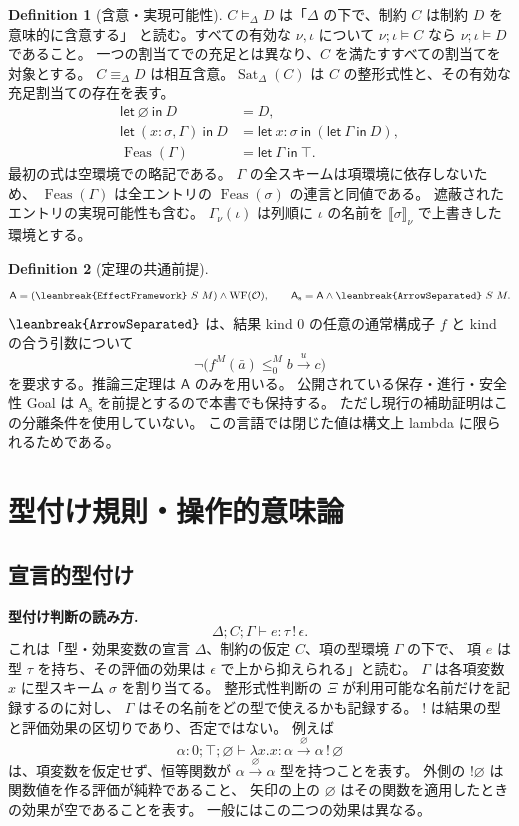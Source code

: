 \documentclass[a4paper,11pt]{article}
\theoremstyle{definition}
\newtheorem{definition}{Definition}[section]
\newcommand{\ops}{\mathcal O}
\newcommand{\emp}{\varnothing}
\newcommand{\arr}[3]{#1\xrightarrow{#2}#3}
\newcommand{\jj}[6]{#1;#2;#3\vdash #4:#5\,!\,#6}
\newcommand{\ent}[2]{#1\models_{\Delta}#2}
\newcommand{\den}[1]{\llbracket #1\rrbracket}
\newcommand{\Let}[3]{\mathsf{let}\ #1:#2\ \mathsf{in}\ #3}
\newcommand{\Feas}{\operatorname{Feas}}
\newcommand{\WF}{\operatorname{WF}}
\newcommand{\lean}[1]{\ifmmode\text{\texttt{\leanbreak{#1}}}\else\texttt{\leanbreak{#1}}\fi}
\newcommand{\A}{\mathsf A}
\newcommand{\AS}{\mathsf A_{\mathrm s}}
\begin{document}
\begin{definition}[含意・実現可能性]
$\ent C D$ は「$\Delta$ の下で、制約 $C$ は制約 $D$ を意味的に含意する」
と読む。すべての有効な $\nu,\iota$ について
$\nu;\iota\models C$ なら $\nu;\iota\models D$ であること。
一つの割当てでの充足とは異なり、$C$ を満たすすべての割当てを対象とする。
$C\equiv_\Delta D$ は相互含意。$\operatorname{Sat}_\Delta(C)$ は
$C$ の整形式性と、その有効な充足割当ての存在を表す。
\begin{align*}
 \mathsf{let}\ \emp\ \mathsf{in}\ D&=D,\\
 \mathsf{let}\ (x:\sigma,\Gamma)\ \mathsf{in}\ D
   &=\Let{x}{\sigma}{(\mathsf{let}\ \Gamma\ \mathsf{in}\ D)},\\
 \Feas(\Gamma)&=\mathsf{let}\ \Gamma\ \mathsf{in}\ \top.
\end{align*}
最初の式は空環境での略記である。
$\Gamma$ の全スキームは項環境に依存しないため、
$\Feas(\Gamma)$ は全エントリの $\Feas(\sigma)$ の連言と同値である。
遮蔽されたエントリの実現可能性も含む。
$\Gamma_\nu(\iota)$ は列順に $\iota$ の名前を $\den\sigma_\nu$ で上書きした環境とする。
\end{definition}

\begin{definition}[定理の共通前提]
\[
 \A=(\lean{EffectFramework}\ S\ M)\land\WF(\ops),\qquad
 \AS=\A\land\lean{ArrowSeparated}\ S\ M.
\]
$\lean{ArrowSeparated}$ は、結果 kind $0$ の任意の通常構成子 $f$ と kind の合う引数について
\[
 \neg\bigl(f^M(\bar a)\leq^M_0\arr b u c\bigr)
\]
を要求する。推論三定理は $\A$ のみを用いる。
公開されている保存・進行・安全性 Goal は $\AS$ を前提とするので本書でも保持する。
ただし現行の補助証明はこの分離条件を使用していない。
この言語では閉じた値は構文上 lambda に限られるためである。
\end{definition}

\section{型付け規則・操作的意味論}
\label{sec:typing}
\subsection{宣言的型付け}
\noindent\textbf{型付け判断の読み方.}
\[
 \jj\Delta C\Gamma e\tau\epsilon.
\]
これは「型・効果変数の宣言 $\Delta$、制約の仮定 $C$、項の型環境 $\Gamma$ の下で、
項 $e$ は型 $\tau$ を持ち、その評価の効果は $\epsilon$ で上から抑えられる」と読む。
$\Gamma$ は各項変数 $x$ に型スキーム $\sigma$ を割り当てる。
整形式性判断の $\Xi$ が利用可能な名前だけを記録するのに対し、
$\Gamma$ はその名前をどの型で使えるかも記録する。
$!$ は結果の型と評価効果の区切りであり、否定ではない。
例えば
\[
 \jj{\alpha:0}{\top}{\emp}{\lambda x.x}{\arr\alpha\emp\alpha}\emp
\]
は、項変数を仮定せず、恒等関数が $\arr\alpha\emp\alpha$ 型を持つことを表す。
外側の $!\emp$ は関数値を作る評価が純粋であること、
矢印の上の $\emp$ はその関数を適用したときの効果が空であることを表す。
一般にはこの二つの効果は異なる。
\end{document}
